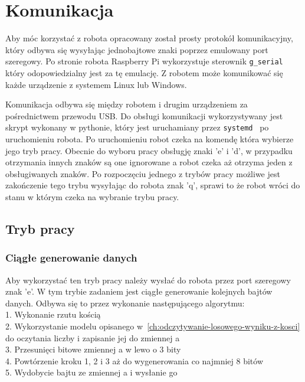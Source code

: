 \chapter{Komunikacja}\label{ch:komunikacja}
Aby móc korzystać z robota opracowany został prosty protokół komunikacyjny, który 
odbywa się wysyłając jednobajtowe znaki poprzez emulowany port szeregowy. Po stronie robota Raspberry Pi wykorzystuje 
sterownik \texttt{g\_serial}~\cite{g_serial} który odopowiedzialny jest za tę emulację. Z robotem może komunikować się 
każde urządzenie z systemem Linux lub Windows. 

Komunikacja odbywa się między robotem i drugim urządzeniem za pośrednictwem przewodu USB.
Do obsługi komunikacji wykorzystywany jest skrypt wykonany w pythonie, który jest uruchamiany 
przez \texttt{systemd}~\cite{systemd} po uruchomieniu robota. Po uruchomieniu robot czeka na komendę która wybierze jego tryb pracy.
Obecnie do wyboru pracy obsługję znaki 'e' i 'd', w przypadku otrzymania innych znaków są one ignorowane a robot czeka aż otrzyma jeden z obsługiwanych znaków.
Po rozpoczęciu jednego z trybów pracy możliwe jest zakończenie tego trybu wysyłając do robota znak 'q', sprawi to że robot wróci do stanu w którym czeka na wybranie 
trybu pracy.
 

\section{Tryb pracy} 

\subsection{Ciągłe generowanie danych}
Aby wykorzystać ten tryb pracy należy wysłać do robota przez port szeregowy znak 'e'.
W tym trybie zadaniem jest ciągłe generowanie kolejnych bajtów danych.
Odbywa się to przez wykonanie następującego algorytmu:\\
1. Wykonanie rzutu kością \\
2. Wykorzystanie modelu opisanego w~\ref{ch:odczytywanie-losowego-wyniku-z-kosci} do oczytania liczby i zapisanie jej do zmiennej a \\
3. Przesunięci bitowe zmiennej a w lewo o 3 bity \\
4. Powtórzenie kroku 1, 2 i 3 aż do wygenerowania co najmniej 8 bitów \\
5. Wydobycie bajtu ze zmiennej a i wysłanie go \\

